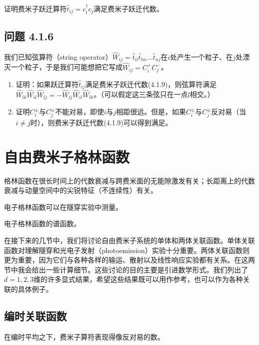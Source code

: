 证明费米子跃迁算符$\hat{t}_{ij}=c_{i}^{\dagger}c_{j}$满足费米子跃迁代数。

\subsection*{问题 4.1.6}

我们已知弦算符（string operator）$\hat{W}_{ij}=\hat{t}_{il}\hat{t}_{lm}\ldots\hat{t}_{nj}$在$i$处产生一个粒子、在$j$处湮灭一个粒子，于是我们可能想把它写成$\hat{W}_{ij}=C_{i}^{+}C_{j}^{-}$。

\begin{enumerate}
\item[(a)] 证明：如果跃迁算符$\hat{t}_{ij}$满足费米子跃迁代数(4.1.9)，则弦算符满足$\hat{W}_{lk}\hat{W}_{il}\allowbreak\hat{W}_{lj}\allowbreak=-\hat{W}_{lj}\allowbreak\hat{W}_{il}\allowbreak\hat{W}_{lk}$。（可以假定这三条弦只在一点$l$相交。）
\item[(b)] 证明$C_{i}^{\pm}$与$C_{j}^{\pm}$不能对易，即使$i$与$j$相距很远。但是，如果$C_{i}^{\pm}$与$C_{j}^{\pm}$反对易（当$i\neq j$时），则费米子跃迁代数(4.1.9)可以得到满足。
\end{enumerate}

\section{自由费米子格林函数}

\begin{keypoints}
\item 格林函数在很长时间上的代数衰减与跨费米面的无能隙激发有关；长距离上的代数衰减与动量空间中的尖锐特征（不连续性）有关。
\item 电子格林函数可以在隧穿实验中测量。
\item 电子格林函数的谱函数。
\end{keypoints}

在接下来的几节中，我们将讨论自由费米子系统的单体和两体关联函数。单体关联函数对理解隧穿和光电子发射（photoemission）实验十分重要。两体关联函数则更为重要，因为它们与各种各样的输运、散射以及线性响应实验都有关系。在这两节中我会给出一些计算细节。这些讨论的目的主要是引进数学形式。我们列出了$d=1,2,3$维的许多显式结果，希望这些结果既可以用作参考，也可以作为各种关联的具体例子。

\subsection{编时关联函数}

\begin{keypoints}
\item 在编时平均之下，费米子算符表现得像反对易的数。
\end{keypoints}

